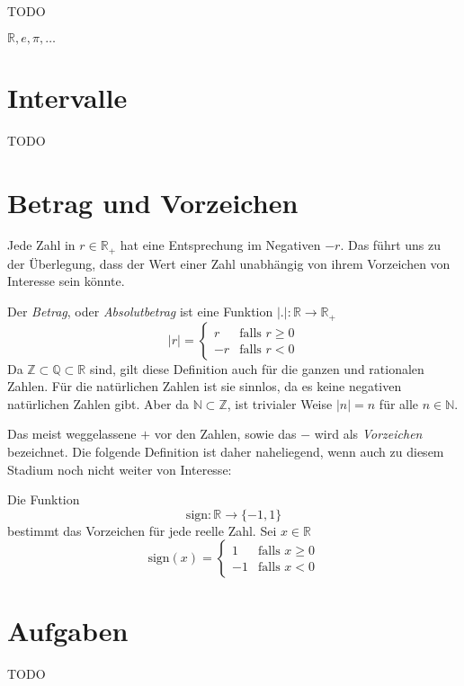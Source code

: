 TODO

$\mathbb{R}, e, \pi, \dots $

\section{Intervalle}

TODO

\section{Betrag und Vorzeichen}

Jede Zahl in $r\in \mathbb{R}_+$ hat eine Entsprechung im Negativen $-r$. Das führt uns zu der Überlegung, dass der Wert einer Zahl unabhängig von ihrem Vorzeichen von Interesse sein könnte.

\begin{definition}
Der \textsl{Betrag}, oder \textsl{Absolutbetrag} ist eine Funktion $\vert . \vert : \mathbb{R} \longrightarrow \mathbb{R}_+$
\begin{equation}
\vert r \vert = \begin{cases}
r & \text{falls } r\ge 0 \\
-r & \text{falls } r<0
\end{cases}
\end{equation}
Da $\mathbb{Z} \subset \mathbb{Q} \subset \mathbb{R}$ sind, gilt diese Definition auch für die ganzen und rationalen Zahlen. Für die natürlichen Zahlen ist sie sinnlos, da es keine negativen natürlichen Zahlen gibt. Aber da $\mathbb{N} \subset \mathbb{Z}$, ist trivialer Weise $\vert n \vert = n$ für alle $n\in \mathbb{N}$.
\end{definition}

Das meist weggelassene $+$ vor den Zahlen, sowie das $-$ wird als \textsl{Vorzeichen} bezeichnet. Die folgende Definition ist daher naheliegend, wenn auch zu diesem Stadium noch nicht weiter von Interesse:

\begin{definition}
Die Funktion 
\[
\text{sign} : \mathbb{R} \longrightarrow \lbrace -1,1\rbrace
\]
bestimmt das Vorzeichen für jede reelle Zahl. Sei $x \in \mathbb{R}$
\begin{equation}
\text{sign}(x) = \begin{cases}
1 & \text{falls } x\ge 0 \\
-1 & \text{falls } x < 0
\end{cases}
\end{equation}
\end{definition}

\section{Aufgaben}
TODO
